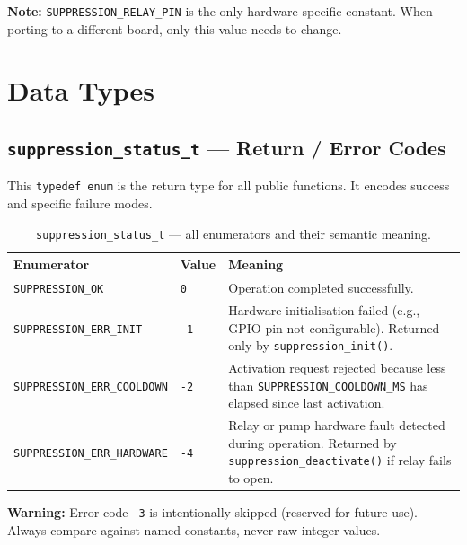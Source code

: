 \documentclass[12pt]{article}
\begin{document}
\begin{notebox}
\textbf{Note:} \texttt{SUPPRESSION\_RELAY\_PIN} is the only hardware-specific constant. When porting to a different board, only this value needs to change.
\end{notebox}

\section{Data Types}

\subsection{\texttt{suppression\_status\_t} --- Return / Error Codes}

This \texttt{typedef enum} is the return type for all public functions. It encodes success and specific failure modes.

\begin{table}[H]
\centering\small
\begin{tabularx}{\textwidth}{L{5.5cm} L{1.5cm} X}
\toprule
\textbf{Enumerator} & \textbf{Value} & \textbf{Meaning} \\
\midrule
\texttt{SUPPRESSION\_OK}           & \texttt{0}  & Operation completed successfully. \\[4pt]
\texttt{SUPPRESSION\_ERR\_INIT}    & \texttt{-1} & Hardware initialisation failed (e.g., GPIO pin not configurable). Returned only by \texttt{suppression\_init()}. \\[4pt]
\texttt{SUPPRESSION\_ERR\_COOLDOWN}& \texttt{-2} & Activation request rejected because less than \texttt{SUPPRESSION\_COOLDOWN\_MS} has elapsed since last activation. \\[4pt]
\texttt{SUPPRESSION\_ERR\_HARDWARE}& \texttt{-4} & Relay or pump hardware fault detected during operation. Returned by \texttt{suppression\_deactivate()} if relay fails to open. \\
\bottomrule
\end{tabularx}
\caption{\texttt{suppression\_status\_t} --- all enumerators and their semantic meaning.}
\end{table}

\begin{warnbox}
\textbf{Warning:} Error code \texttt{-3} is intentionally skipped (reserved for future use). Always compare against named constants, never raw integer values.
\end{warnbox}
\end{document}
